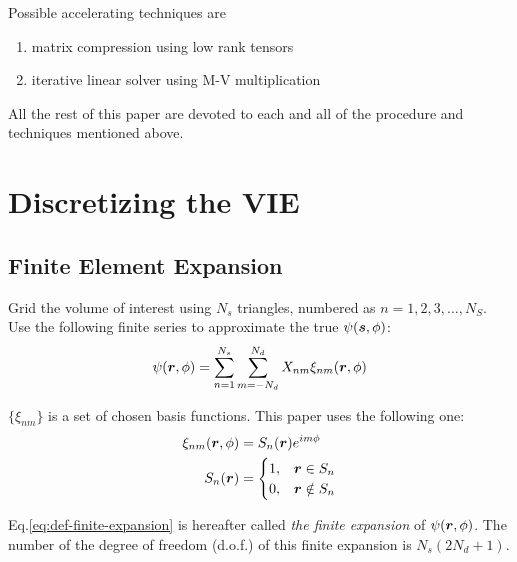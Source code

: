 \documentclass [10pt,letterpaper]{article}
\begin{document}
Possible accelerating techniques are
\begin{enumerate}
	\setcounter{enumi} 4
	\item matrix compression using low rank tensors
	\item iterative linear solver using M-V multiplication
\end{enumerate}

All the rest of this paper are devoted to each and all of the procedure and techniques mentioned above.


\section{Discretizing the VIE}
\label{sec:discretizing-the-vie}

\subsection{Finite Element Expansion}
\label{sub:finite-element-expansion}

Grid the volume of interest using $N_s$ triangles, numbered as $n=1,2,3,\ldots,N_S$.
Use the following finite series to approximate the true $\psi(\vectorsym{s},\phi)$:
\begin{equation} \label{eq:def-finite-expansion}
	\psi(\vectorsym{r},\phi)
	=\sum\limits_{n=1}^{N_s}
	\sum\limits_{m=-N_d}^{N_d}
	X_{n m}
	\xi_{n m}(\vectorsym{r},\phi)
\end{equation}

$\{\xi_{n m}\}$ is a set of chosen basis functions. This paper uses the following one:
\begin{subequations} \begin{align} \label{eq:def-basis-function}
	\xi_{n m}(\vectorsym{r},\phi) 
	&= 
	S_n(\vectorsym{r})e^{i m \phi}
	\\
	S_n(\vectorsym{r}) &=
	\begin{cases}
		1, & \vectorsym{r}\in S_n
		\\
		0, & \vectorsym{r}\notin S_n
	\end{cases}
\end{align} \end{subequations}

Eq.\eqref{eq:def-finite-expansion} is hereafter called \emph{the finite expansion} of $\psi(\vectorsym{r},\phi)$.
The number of the degree of freedom (d.o.f.) of this finite expansion is $N_s(2N_d+1)$.
\\
\end{document}
